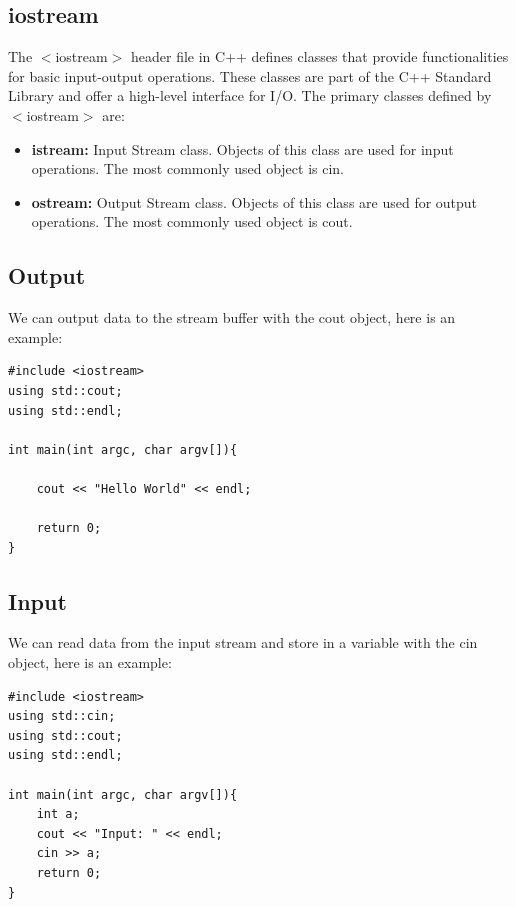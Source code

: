 \documentclass{report}
\begin{document}
    \subsection{iostream}
    \bigbreak \noindent 
    The $<$iostream$>$ header file in C++ defines classes that provide functionalities for basic input-output operations. These classes are part of the C++ Standard Library and offer a high-level interface for I/O. The primary classes defined by $<$iostream$>$ are:
    \begin{itemize}
        \item \textbf{istream:} Input Stream class. Objects of this class are used for input operations. The most commonly used object is cin.
        \item \textbf{ostream:} Output Stream class. Objects of this class are used for output operations. The most commonly used object is cout.
    \end{itemize}
    \bigbreak \noindent 
    \subsection{Output}
    \bigbreak \noindent 
    We can output data to the stream buffer with the cout object, here is an example:
    \bigbreak \noindent 
    \sepline
    \begin{verbatim}
#include <iostream>
using std::cout;
using std::endl;

int main(int argc, char argv[]){

    cout << "Hello World" << endl;

    return 0;
}
    \end{verbatim}
    \sepline
    \bigbreak \noindent 
    \subsection{Input}
    \bigbreak \noindent 
    We can read data from the input stream and store in a variable with the cin object, here is an example:
    \bigbreak \noindent 
    \sepline
    \begin{verbatim}
#include <iostream>
using std::cin;
using std::cout;
using std::endl;

int main(int argc, char argv[]){
    int a;
    cout << "Input: " << endl;
    cin >> a;
    return 0;
}

    \end{verbatim}
    \sepline

    \pagebreak \bigbreak \noindent 
\end{document}
